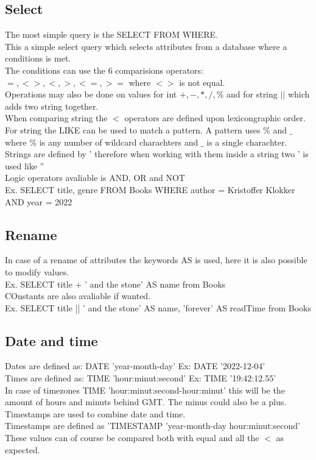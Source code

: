 \documentclass[12pt, a4paper]{article}
\begin{document}
		\subsection{Select}
			The most simple query is the SELECT FROM WHERE.\\
			This a simple select query which selects attributes from a database where a conditions is met.\\
			The conditions can use the 6 comparisions operators: $=,<>,<,>,<=,>=$ where $<>$ is not equal.\\
			Operations may also be done on values for int $+,-,*,/,\%$ and for string $||$ which adds two string together.\\
			When comparing string the $<$ operators are defined upon lexicongraphic order.\\
			For string the LIKE can be used to match a pattern. A pattern uses $\%$ and $\_$ where $\%$ is any number of wildcard charachters and $\_$ is a single charachter.\\
			Strings are defined by ' therefore when working with them inside a string two ' is used like ''\\
			Logic operators avaliable is AND, OR and NOT\\
			Ex. SELECT title, genre FROM Books WHERE author = Kristoffer Klokker AND year = 2022\\
		\subsection{Rename}
			In case of a rename of attributes the keywords AS is used, here it is also possible to modify values.\\
			Ex. SELECT title + ' and the stone' AS name from Books\\
			COnstants are also avaliable if wanted.\\
			Ex. SELECT title || ' and the stone' AS name, 'forever' AS readTime from Books\\
		\subsection{Date and time}
			Dates are defined as: DATE 'year-month-day' Ex: DATE '2022-12-04'\\
			Times are defined as: TIME 'hour:minut:second' Ex: TIME '19:42:12.55'\\
			In case of timezones TIME 'hour:minut:second-hour:minut' this will be the amount of hours and minuts behind GMT. The minus could also be a plus.\\
			Timestamps are used to combine date and time.\\
			Timestamps are defined as 'TIMESTAMP 'year-month-day hour:minut:second'\\
			These values can of course be compared both with equal and all the $<$ as expected.
\end{document}
